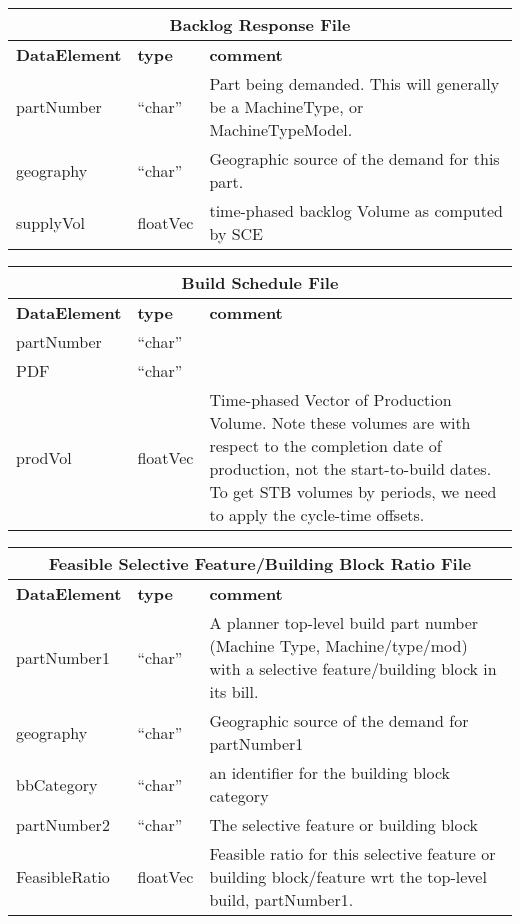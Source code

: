 \vspace{.5in}

\begin{tabular}{llp{4in}}
\multicolumn{3}{c}{{\bf Backlog Response File}}\\ \hline\hline
{\bf DataElement} &  {\bf type}  &   {\bf comment} \\ \hline
partNumber  & ``char'' &     Part being demanded.  This will generally be a
                       MachineType, or MachineTypeModel. \\
geography   & ``char''  &    Geographic source of the demand for this part. \\
supplyVol   & floatVec&  time-phased backlog Volume as computed by SCE \\
\end{tabular}

\vspace{.5in}

\begin{tabular}{llp{4in}}
\multicolumn{3}{c}{{\bf Build Schedule File}}\\ \hline\hline
{\bf DataElement} &  {\bf type}  &   {\bf comment} \\ \hline
partNumber & ``char''  \\
PDF        & ``char''  \\
prodVol    & floatVec&  Time-phased Vector of Production Volume.  Note
                      these volumes are with respect to the completion
                      date of production, not the start-to-build dates.
                      To get STB volumes by periods, we need to apply
                      the cycle-time offsets. \\
\end{tabular}

\vspace{.5in}

\begin{tabular}{llp{4in}}
\multicolumn{3}{c}{{\bf Feasible Selective Feature/Building Block Ratio File}}\\ \hline\hline
{\bf DataElement} &  {\bf type}  &   {\bf comment} \\ \hline
partNumber1  & ``char'' &       A planner top-level build part number 
                            (Machine Type, Machine/type/mod)
                            with a selective feature/building block in its bill.  \\
geography   & ``char''    &      Geographic source of the demand for partNumber1 \\
bbCategory &  ``char'' &    an identifier for the building block category  \\
partNumber2  & ``char'' &      The selective feature or building block \\

FeasibleRatio    & floatVec &   Feasible ratio for this selective feature or 
                            building block/feature wrt the top-level build, partNumber1. \\
\end{tabular}

